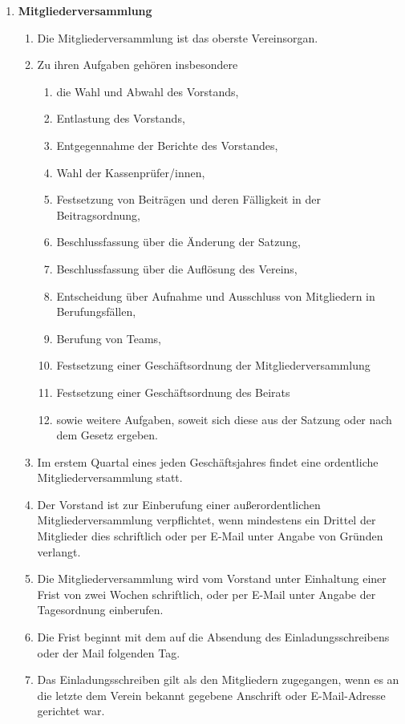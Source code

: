 \documentclass[german]{article}
\newcommand{\paragr}[1]{\item \textsf{\textbf{#1}}}
\begin{document}
\begin{enumerate}
\paragr{Mitgliederversammlung}
\begin{enumerate}

\item Die Mitgliederversammlung ist das oberste Vereinsorgan.

\item Zu ihren Aufgaben gehören insbesondere
\begin{enumerate}
\item die Wahl und Abwahl des Vorstands,
\item Entlastung des Vorstands,
\item Entgegennahme der Berichte des Vorstandes,
\item Wahl der Kassenprüfer/innen,
\item Festsetzung von Beiträgen und deren Fälligkeit in der Beitragsordnung,
\item Beschlussfassung über die Änderung der Satzung,
\item Beschlussfassung über die Auflösung des Vereins,
\item Entscheidung über Aufnahme und Ausschluss von Mitgliedern in Berufungsfällen,
\item Berufung von Teams,
\item Festsetzung einer Geschäftsordnung der Mitgliederversammlung
\item Festsetzung einer Geschäftsordnung des Beirats
\item sowie weitere Aufgaben, soweit sich diese aus der Satzung oder nach dem Gesetz ergeben.
\end{enumerate}
\item Im erstem Quartal eines jeden Geschäftsjahres findet eine ordentliche Mitgliederversammlung statt.

\item Der Vorstand ist zur Einberufung einer außerordentlichen Mitgliederversammlung verpflichtet, wenn mindestens ein Drittel der Mitglieder dies schriftlich oder per E-Mail unter Angabe von Gründen verlangt.

\item Die Mitgliederversammlung wird vom Vorstand unter Einhaltung einer Frist von zwei Wochen schriftlich, oder per E-Mail unter Angabe der Tagesordnung einberufen.

\item Die Frist beginnt mit dem auf die Absendung des Einladungsschreibens oder der Mail folgenden Tag.

\item Das Einladungsschreiben gilt als den Mitgliedern zugegangen, wenn es an die letzte dem Verein bekannt gegebene Anschrift oder E-Mail-Adresse gerichtet war.


\end{enumerate}
\end{enumerate}
\end{document}
